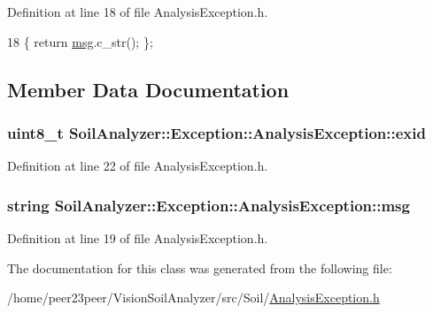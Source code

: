 Definition at line 18 of file Analysis\+Exception.\+h.


\begin{DoxyCode}
18 \{ \textcolor{keywordflow}{return} \hyperlink{class_soil_analyzer_1_1_exception_1_1_analysis_exception_a6bdd68db6677acb26738031746b761f4}{msg}.c\_str(); \};
\end{DoxyCode}


\subsection{Member Data Documentation}
\hypertarget{class_soil_analyzer_1_1_exception_1_1_analysis_exception_a2f79cb4a7d481fde0aabaf8930a123de}{}
\subsubsection[{exid}]{\setlength{\rightskip}{0pt plus 5cm}uint8\+\_\+t Soil\+Analyzer\+::\+Exception\+::\+Analysis\+Exception\+::exid\hspace{0.3cm}{\ttfamily [private]}}\label{class_soil_analyzer_1_1_exception_1_1_analysis_exception_a2f79cb4a7d481fde0aabaf8930a123de}


Definition at line 22 of file Analysis\+Exception.\+h.

\hypertarget{class_soil_analyzer_1_1_exception_1_1_analysis_exception_a6bdd68db6677acb26738031746b761f4}{}
\subsubsection[{msg}]{\setlength{\rightskip}{0pt plus 5cm}string Soil\+Analyzer\+::\+Exception\+::\+Analysis\+Exception\+::msg\hspace{0.3cm}{\ttfamily [private]}}\label{class_soil_analyzer_1_1_exception_1_1_analysis_exception_a6bdd68db6677acb26738031746b761f4}


Definition at line 19 of file Analysis\+Exception.\+h.



The documentation for this class was generated from the following file\+:\begin{DoxyCompactItemize}
\item 
/home/peer23peer/\+Vision\+Soil\+Analyzer/src/\+Soil/\hyperlink{_analysis_exception_8h}{Analysis\+Exception.\+h}\end{DoxyCompactItemize}
